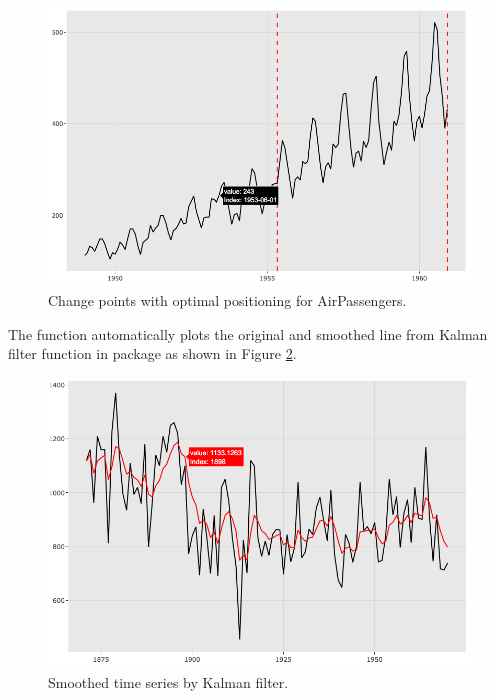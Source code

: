 \begin{figure}[htbp]
  \centering
  \includegraphics[width=145mm,scale=0.8]{images/changepoint_caption.png}
  \caption{Change points with optimal positioning for AirPassengers.}
  \label{figure:changepoint_caption}
\end{figure}

The  function automatically plots the original and
smoothed line from Kalman filter function in  package as shown
in Figure \ref{figure:dlm_caption}.

\begin{Schunk}
\end{Schunk}

\begin{figure}[htbp]
  \centering
  \includegraphics[width=145mm,scale=0.8]{images/dlm_caption.png}
  \caption{Smoothed time series by Kalman filter.}
  \label{figure:dlm_caption}
\end{figure}

